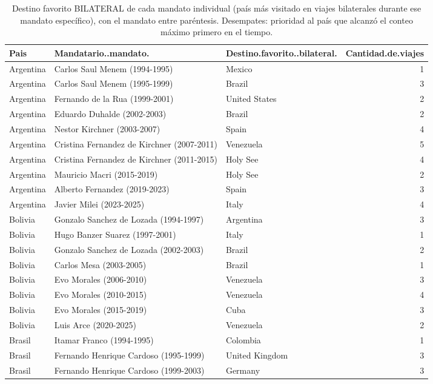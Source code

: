 \documentclass[11pt,a4paper]{article}
\begin{document}
\begin{longtable}{lllr}
\caption{Destino favorito BILATERAL de cada mandato individual (pa\'is m\'as visitado en viajes bilaterales durante ese mandato espec\'ifico), con el mandato entre par\'entesis. Desempates: prioridad al pa\'is que alcanz\'o el conteo m\'aximo primero en el tiempo.} \\ 
  \hline
Pais & Mandatario..mandato. & Destino.favorito..bilateral. & Cantidad.de.viajes \\ 
  \hline
Argentina & Carlos Saul Menem (1994-1995) & Mexico &   1 \\ 
  Argentina & Carlos Saul Menem (1995-1999) & Brazil &   3 \\ 
  Argentina & Fernando de la Rua (1999-2001) & United States &   2 \\ 
  Argentina & Eduardo Duhalde (2002-2003) & Brazil &   2 \\ 
  Argentina & Nestor Kirchner (2003-2007) & Spain &   4 \\ 
  Argentina & Cristina Fernandez de Kirchner (2007-2011) & Venezuela &   5 \\ 
  Argentina & Cristina Fernandez de Kirchner (2011-2015) & Holy See &   4 \\ 
  Argentina & Mauricio Macri (2015-2019) & Holy See &   2 \\ 
  Argentina & Alberto Fernandez (2019-2023) & Spain &   3 \\ 
  Argentina & Javier Milei (2023-2025) & Italy &   4 \\ 
  Bolivia & Gonzalo Sanchez de Lozada (1994-1997) & Argentina &   3 \\ 
  Bolivia & Hugo Banzer Suarez (1997-2001) & Italy &   1 \\ 
  Bolivia & Gonzalo Sanchez de Lozada (2002-2003) & Brazil &   2 \\ 
  Bolivia & Carlos Mesa (2003-2005) & Brazil &   1 \\ 
  Bolivia & Evo Morales (2006-2010) & Venezuela &   3 \\ 
  Bolivia & Evo Morales (2010-2015) & Venezuela &   4 \\ 
  Bolivia & Evo Morales (2015-2019) & Cuba &   3 \\ 
  Bolivia & Luis Arce (2020-2025) & Venezuela &   2 \\ 
  Brasil & Itamar Franco (1994-1995) & Colombia &   1 \\ 
  Brasil & Fernando Henrique Cardoso (1995-1999) & United Kingdom &   3 \\ 
  Brasil & Fernando Henrique Cardoso (1999-2003) & Germany &   3 \\ 

\end{longtable}
\end{document}
